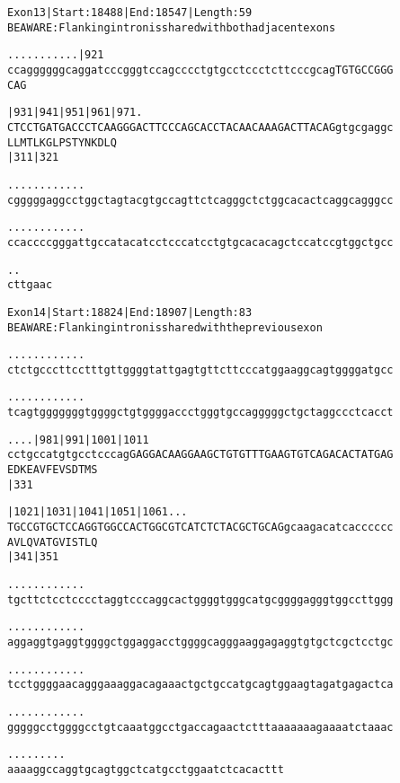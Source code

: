 \documentclass{article}
\begin{document}
\newpage
\begin{alltt}
Exon 13 | Start: 18488 | End: 18547 | Length: 59
BE AWARE: Flanking intron is shared with both adjacent exons

.    .    .    .    .    .    .    .    .    .    .  |921   
ccaggggggcaggatcccgggtccagcccctgtgcctccctcttcccgcagTGTGCCGGG
                                                   C  A  G  

   |931      |941      |951      |961      |971        .    
CTCCTGATGACCCTCAAGGGACTTCCCAGCACCTACAACAAAGACTTACAGgtgcgaggc
L  L  M  T  L  K  G  L  P  S  T  Y  N  K  D  L  Q           
   |311                          |321                       

.    .    .    .    .    .    .    .    .    .    .    .    
cgggggaggcctggctagtacgtgccagttctcagggctctggcacactcaggcagggcc

.    .    .    .    .    .    .    .    .    .    .    .    
ccaccccgggattgccatacatcctcccatcctgtgcacacagctccatccgtggctgcc

.    . 
cttgaac
\end{alltt}
\newpage
\begin{alltt}
Exon 14 | Start: 18824 | End: 18907 | Length: 83
BE AWARE: Flanking intron is shared with the previous exon

.    .    .    .    .    .    .    .    .    .    .    .    
ctctgcccttcctttgttggggtattgagtgttcttcccatggaaggcagtggggatgcc

.    .    .    .    .    .    .    .    .    .    .    .    
tcagtgggggggtggggctgtggggaccctgggtgccagggggctgctaggccctcacct

.    .    .    .     |981      |991      |1001     |1011    
cctgccatgtgcctcccagGAGGACAAGGAAGCTGTGTTTGAAGTGTCAGACACTATGAG
                   E  D  K  E  A  V  F  E  V  S  D  T  M  S 
                               |331                         

 |1021     |1031     |1041     |1051     |1061 .    .    .  
TGCCGTGCTCCAGGTGGCCACTGGCGTCATCTCTACGCTGCAGgcaagacatcacccccc
 A  V  L  Q  V  A  T  G  V  I  S  T  L  Q                   
 |341                          |351                         

  .    .    .    .    .    .    .    .    .    .    .    .  
tgcttctcctcccctaggtcccaggcactggggtgggcatgcggggagggtggccttggg

  .    .    .    .    .    .    .    .    .    .    .    .  
aggaggtgaggtggggctggaggacctggggcagggaaggagaggtgtgctcgctcctgc

  .    .    .    .    .    .    .    .    .    .    .    .  
tcctggggaacagggaaaggacagaaactgctgccatgcagtggaagtagatgagactca

  .    .    .    .    .    .    .    .    .    .    .    .  
gggggcctggggcctgtcaaatggcctgaccagaactctttaaaaaaagaaaatctaaac

  .    .    .    .    .    .    .    .    .
aaaaggccaggtgcagtggctcatgcctggaatctcacacttt
\end{alltt}
\end{document}
